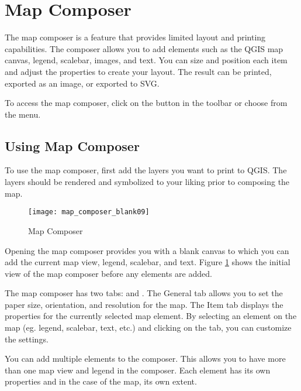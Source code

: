 
\section{Map Composer}\label{label_mapcomposer}

The map composer is a feature that provides limited layout and printing
capabilities. The composer allows you to add elements such as the QGIS map
canvas, legend, scalebar, images, and text. You can size and position each item and
adjust the properties to create your layout. The result can be printed,
exported as an image, or exported to SVG.

To access the map composer, click on the 
button in the toolbar or choose  from the  menu.

\subsection{Using Map Composer}\label{label_usemapcomposer} 

To use the map composer, first add the layers you
want to print to QGIS. The layers should be rendered and symbolized to your
liking prior to composing the map. 

\begin{figure}[ht]
   \begin{center}
   \caption{Map Composer}\label{fig:map_composer_blank}\smallskip
   \texttt{[image: map\_composer\_blank09]}
\end{center}  
\end{figure}

Opening the map composer provides you with a blank canvas to which you can add
the current map view, legend, scalebar, and text. Figure
\ref{fig:map_composer_blank} shows the initial view of the map composer before
any elements are added.

The map composer has two tabs:  and . The General tab
allows you to set the paper size, orientation, and resolution for the map.
The Item tab displays the properties for the currently selected map element.
By selecting an element on the map (eg. legend, scalebar, text, etc.) and
clicking on the  tab, you can customize the settings.

You can add multiple elements to the composer. This allows you to have more
than one map view and legend in the composer. Each element has its own
properties and in the case of the map, its own extent.

